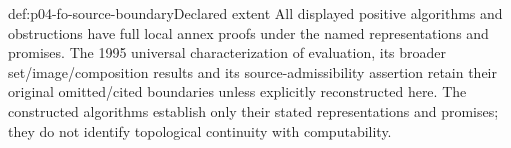 \begin{proofboundary}{def:p04-fo-source-boundary}{Declared extent}
All displayed positive algorithms and obstructions have full
local annex proofs under the named representations and promises.
The 1995 universal characterization of evaluation, its broader
set/image/composition results and its source-admissibility
assertion retain their original omitted/cited boundaries unless
explicitly reconstructed here.
The constructed algorithms establish only their stated
representations and promises; they do not identify
topological continuity with computability.
\end{proofboundary}
